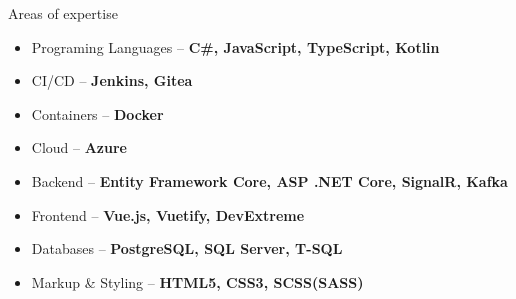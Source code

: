\documentclass{resume}
\begin{document}
\begin{rSection}{Areas of expertise}
    \begin{minipage}[t]{0.33\textwidth}
        \begin{flushleft}
            \begin{itemize}[leftmargin=0.5cm]
                \setlength\itemsep{0.4em}
                \item Programing Languages – \textbf{C\#, JavaScript, TypeScript, Kotlin}
                \item CI/CD – \textbf{Jenkins, Gitea}
                \item Containers – \textbf{Docker}
                \item Cloud – \textbf{Azure}
            \end{itemize}
        \end{flushleft}
    \end{minipage}
    \begin{minipage}[t]{0.33\textwidth}
        \begin{flushleft}
            \begin{itemize}[leftmargin=0.5cm]
                \setlength\itemsep{0.4em}
                \item Backend – \textbf{Entity Framework Core, ASP .NET Core, SignalR, Kafka}
                \item Frontend – \textbf{Vue.js, Vuetify, DevExtreme}
            \end{itemize}
        \end{flushleft}
    \end{minipage}
    \begin{minipage}[t]{0.33\textwidth}
        \begin{flushleft}
            \begin{itemize}[leftmargin=0.5cm]
                \setlength\itemsep{0.4em}
                \item Databases – \textbf{PostgreSQL, SQL Server, T-SQL}
                \item Markup \& Styling – \textbf{HTML5, CSS3, SCSS(SASS)}
            \end{itemize}
        \end{flushleft}
    \end{minipage}
\end{rSection}
\end{document}
